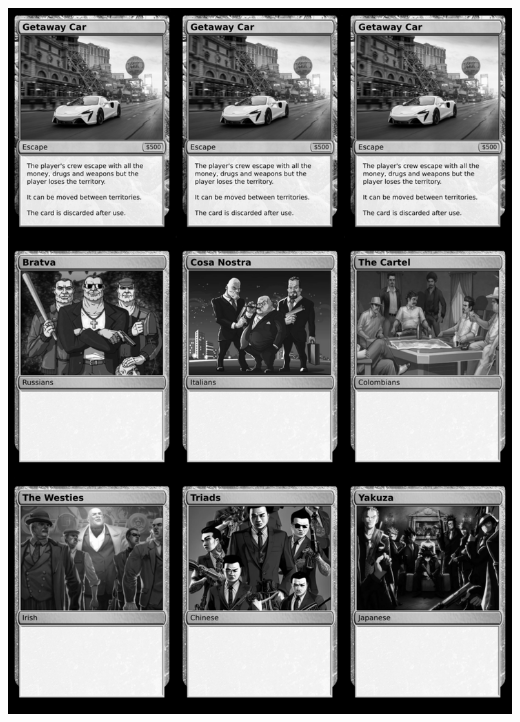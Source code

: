 \documentclass[a4paper]{article}
\begin{document}
\begin{center}
	\centering
	\includegraphics[width=190.5mm,height=266.7mm]{output/temp/page32.png}
\end{center}

\newpage
\end{document}
